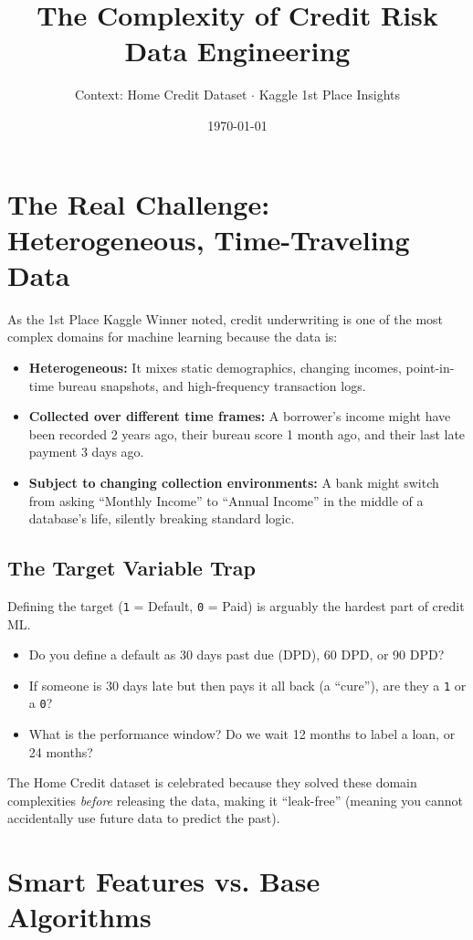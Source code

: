 \documentclass[11pt,a4paper]{article}
\title{\Huge \textbf{The Complexity of Credit Risk Data Engineering}}
\author{Context: Home Credit Dataset $\cdot$ Kaggle 1st Place Insights}
\date{\today}
\begin{document}
\maketitle

\section{The Real Challenge: Heterogeneous, Time-Traveling Data}

As the 1st Place Kaggle Winner noted, credit underwriting is one of the most complex domains for machine learning because the data is:
\begin{itemize}
    \item \textbf{Heterogeneous:} It mixes static demographics, changing incomes, point-in-time bureau snapshots, and high-frequency transaction logs.
    \item \textbf{Collected over different time frames:} A borrower's income might have been recorded 2 years ago, their bureau score 1 month ago, and their last late payment 3 days ago.
    \item \textbf{Subject to changing collection environments:} A bank might switch from asking ``Monthly Income'' to ``Annual Income'' in the middle of a database's life, silently breaking standard logic.
\end{itemize}

\subsection{The Target Variable Trap}
Defining the target (\texttt{1} = Default, \texttt{0} = Paid) is arguably the hardest part of credit ML. 
\begin{itemize}
    \item Do you define a default as 30 days past due (DPD), 60 DPD, or 90 DPD? 
    \item If someone is 30 days late but then pays it all back (a ``cure''), are they a \texttt{1} or a \texttt{0}?
    \item What is the performance window? Do we wait 12 months to label a loan, or 24 months?
\end{itemize}

The Home Credit dataset is celebrated because they solved these domain complexities \textit{before} releasing the data, making it ``leak-free'' (meaning you cannot accidentally use future data to predict the past).

\section{Smart Features vs. Base Algorithms}
\end{document}
